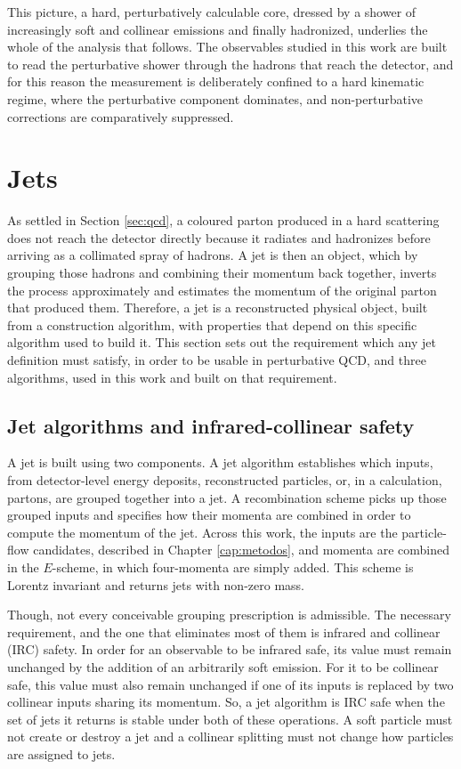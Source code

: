 This picture, a hard, perturbatively calculable core, dressed by a shower of
increasingly soft and collinear emissions and finally hadronized, underlies
the whole of the analysis that follows. The observables studied in this work are
built to read the perturbative shower through the hadrons that reach the
detector, and for this reason the measurement is deliberately confined to a hard
kinematic regime, where the perturbative component dominates, and non-perturbative
corrections are comparatively suppressed.

\section{Jets}
\label{sec:jatos}

As settled in Section \ref{sec:qcd}, a coloured parton produced in a hard
scattering does not reach the detector directly because it radiates
and hadronizes before arriving as a collimated spray of hadrons. A jet is then
an object, which by grouping those hadrons and combining their momentum back together,
inverts the process approximately and estimates the momentum of the original parton that
produced them. Therefore, a jet is a reconstructed physical object, built from a construction
algorithm, with properties that depend on this specific algorithm used to build it. This 
section sets out the requirement which any jet definition must satisfy, in order to
be usable in perturbative QCD, and three algorithms, used in this work and built on that requirement. 

\subsection{Jet algorithms and infrared-collinear safety}
\label{sec:ircsafety}

A jet is built using two components. A jet algorithm establishes which inputs,
from detector-level energy deposits, reconstructed particles, or, in a
calculation, partons, are grouped together into a jet. A recombination scheme
picks up those grouped inputs and specifies how their momenta are combined 
in order to compute the momentum of the jet. Across this work, the inputs are
the particle-flow candidates, described in Chapter \ref{cap:metodos},
and momenta are combined in the
$E$-scheme, in which four-momenta are simply added. This scheme is Lorentz invariant
and returns jets with non-zero mass.

Though, not every conceivable grouping prescription is admissible.
The necessary requirement, and the one that eliminates most of them is infrared and collinear (IRC) safety.
In order for an observable to be infrared safe, its value must remain unchanged 
by the addition of an arbitrarily soft emission. For it to be collinear safe, this value
must also remain unchanged if one of its inputs is replaced by two collinear inputs
sharing its momentum. So, a jet algorithm is IRC safe when the set of jets it returns 
is stable under both of these operations. A soft particle must not create or destroy a jet and a
collinear splitting must not change how particles are assigned to jets.

